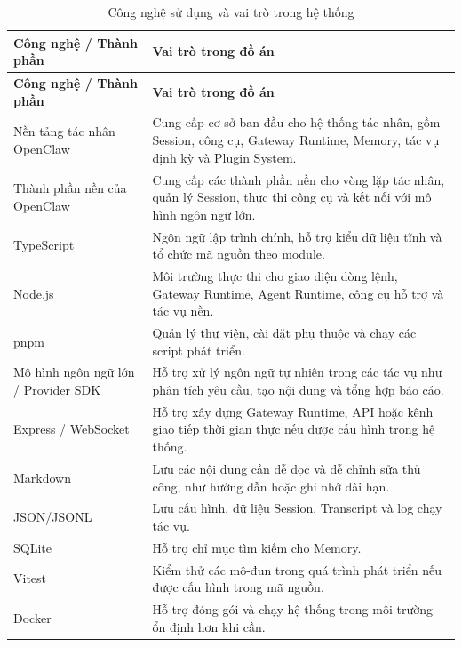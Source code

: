 \documentclass[a4paper]{article}
\begin{document}
\begin{longtable}{L{0.30\textwidth}L{0.60\textwidth}}
\caption{Công nghệ sử dụng và vai trò trong hệ thống}\\
\toprule
\textbf{Công nghệ / Thành phần} & \textbf{Vai trò trong đồ án}\\
\midrule
\endfirsthead
\toprule
\textbf{Công nghệ / Thành phần} & \textbf{Vai trò trong đồ án}\\
\midrule
\endhead

Nền tảng tác nhân OpenClaw & Cung cấp cơ sở ban đầu cho hệ thống tác nhân, gồm Session, công cụ, Gateway Runtime, Memory, tác vụ định kỳ và Plugin System.\\

Thành phần nền của OpenClaw & Cung cấp các thành phần nền cho vòng lặp tác nhân, quản lý Session, thực thi công cụ và kết nối với mô hình ngôn ngữ lớn.\\

TypeScript & Ngôn ngữ lập trình chính, hỗ trợ kiểu dữ liệu tĩnh và tổ chức mã nguồn theo module.\\

Node.js & Môi trường thực thi cho giao diện dòng lệnh, Gateway Runtime, Agent Runtime, công cụ hỗ trợ và tác vụ nền.\\

pnpm & Quản lý thư viện, cài đặt phụ thuộc và chạy các script phát triển.\\

Mô hình ngôn ngữ lớn / Provider SDK & Hỗ trợ xử lý ngôn ngữ tự nhiên trong các tác vụ như phân tích yêu cầu, tạo nội dung và tổng hợp báo cáo.\\

Express / WebSocket & Hỗ trợ xây dựng Gateway Runtime, API hoặc kênh giao tiếp thời gian thực nếu được cấu hình trong hệ thống.\\

Markdown & Lưu các nội dung cần dễ đọc và dễ chỉnh sửa thủ công, như hướng dẫn hoặc ghi nhớ dài hạn.\\

JSON/JSONL & Lưu cấu hình, dữ liệu Session, Transcript và log chạy tác vụ.\\

SQLite & Hỗ trợ chỉ mục tìm kiếm cho Memory.\\

Vitest & Kiểm thử các mô-đun trong quá trình phát triển nếu được cấu hình trong mã nguồn.\\

Docker & Hỗ trợ đóng gói và chạy hệ thống trong môi trường ổn định hơn khi cần.\\

\bottomrule
\end{longtable}
\end{document}
